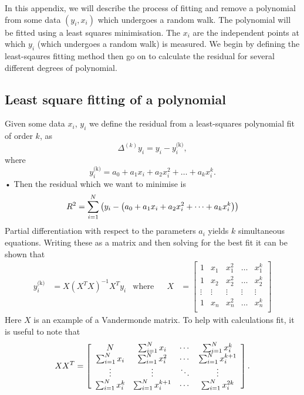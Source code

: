 In this appendix, we will describe the process of fitting and remove a
polynomial from some data $(y_i, x_i)$ which undergoes a random walk. The
polynomial will be fitted using a least squares minimisation. The $x_i$ are
the independent points at which $y_i$ (which undergoes a random walk) is
measured. We begin by defining the least-sqaures fitting method then
go on to calculate the residual for several different degrees of polynomial.

\subsection{Least square fitting of a polynomial}

Given some data $x_{i}$, $y_{i}$ we define the residual from a least-squares
polynomial fit of order $k$, as
\begin{equation}
    \Delta^{(k)}y_{i} = y_{i} - y^{\textrm{(k)}}_{i},
\end{equation}
where
\begin{equation}
y^{\textrm{(k)}}_{i} = a_{0} + a_{1}x_{i} + a_{2}x_{i}^{2} + \dots
                                                           + a_{k} x_{i}^{k}.
\end{equation}•
Then the residual which we want to minimise is
\begin{equation}
R^{2} = \sum_{i=1}^{N}\left(y_{i} - \left(a_{0} + a_{1}x_{i} + a_{2}x_{i}^{2} +
        \dots + a_{k} x_{i}^{k}\right)\right)
\end{equation}
Partial differentiation with respect to the parameters $a_{i}$ yields $k$
simultaneous equations. Writing these as a matrix and then solving
for the best fit it can be shown \citep{WolframLeastSquares} that
\begin{align}
y^{\textrm{(k)}}_{i} & = X \left(X^{T}X\right)^{-1} X^{T} y_{i} & \textrm{where} & &
X & = \left[\begin{array}{ccccc}
1 & x_{1} & x_{1}^{2} & \dots & x_{1}^{k} \\
1 & x_{2} & x_{2}^{2} & \dots & x_{2}^{k} \\
\vdots & \vdots & \vdots & \vdots & \vdots \\
1 & x_{n} & x_{n}^{2} & \dots & x_{n}^{k} \\
\end{array}\right]
\end{align}
Here $X$ is an example of a Vandermonde matrix. To help with calculations
fit, it is useful to note that
\begin{equation}
XX^{T} = \left[\begin{array}{cccc}
N & \sum_{i=1}^{N}x_{i} & \cdots &  \sum_{i=1}^{N}x_{i}^{k} \\
\sum_{i=1}^{N}x_{i} & \sum_{i=1}^{N}x_{i}^{2} & \cdots &  \sum_{i=1}^{N}x_{i}^{k+1} \\
\vdots & \vdots & \ddots & \vdots \\
\sum_{i=1}^{N}x_{i}^{k} & \sum_{i=1}^{N}x_{i}^{k+1} & \cdots &  \sum_{i=1}^{N}x_{i}^{2k}
\end{array}\right].
\end{equation}

